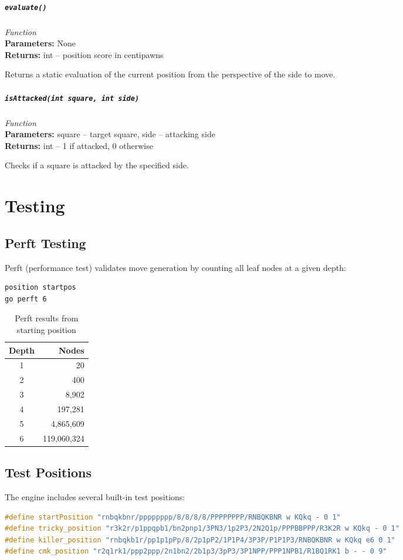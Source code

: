 \documentclass[11pt,a4paper]{report}
\newcommand{\function}[4]{%
    \paragraph{\texttt{#1}} \hfill \textit{#2}\\
    \textbf{Parameters:} #3\\
    \textbf{Returns:} #4
}
\begin{document}
\function{evaluate()}{Function}{None}{int -- position score in centipawns}

Returns a static evaluation of the current position from the perspective of the side to move.

\function{isAttacked(int square, int side)}{Function}{square -- target square, side -- attacking side}{int -- 1 if attacked, 0 otherwise}

Checks if a square is attacked by the specified side.

\chapter{Testing}

\section{Perft Testing}

Perft (performance test) validates move generation by counting all leaf nodes at a given depth:

\begin{lstlisting}[language=bash]
position startpos
go perft 6
\end{lstlisting}

\begin{table}[h]
\centering
\begin{tabular}{cr}
\toprule
\textbf{Depth} & \textbf{Nodes} \\
\midrule
1 & 20 \\
2 & 400 \\
3 & 8,902 \\
4 & 197,281 \\
5 & 4,865,609 \\
6 & 119,060,324 \\
\bottomrule
\end{tabular}
\caption{Perft results from starting position}
\end{table}

\section{Test Positions}

The engine includes several built-in test positions:

\begin{lstlisting}[language=C++]
#define startPosition "rnbqkbnr/pppppppp/8/8/8/8/PPPPPPPP/RNBQKBNR w KQkq - 0 1"
#define tricky_position "r3k2r/p1ppqpb1/bn2pnp1/3PN3/1p2P3/2N2Q1p/PPPBBPPP/R3K2R w KQkq - 0 1"
#define killer_position "rnbqkb1r/pp1p1pPp/8/2p1pP2/1P1P4/3P3P/P1P1P3/RNBQKBNR w KQkq e6 0 1"
#define cmk_position "r2q1rk1/ppp2ppp/2n1bn2/2b1p3/3pP3/3P1NPP/PPP1NPB1/R1BQ1RK1 b - - 0 9"
\end{lstlisting}
\end{document}
